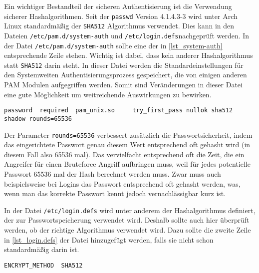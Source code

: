 Ein wichtiger Bestandteil der sicheren Authentisierung ist die Verwendung sicherer Hashalgorithmen. Seit der \texttt{passwd} Version 4.1.4.3-3 wird unter Arch Linux standardmäßig der \texttt{SHA512} Algorithmus verwendet.\cite{UseSha512Hash2009,SHAPasswordHashes} Dies kann in den Dateien \texttt{/etc/pam.d/system-auth} und \texttt{/etc/login.defs}nachgeprüft werden.\cite[S. 46]{GuideSecureConfiguration2011} In der Datei \texttt{/etc/pam.d/system-auth} sollte eine der in \ref{lst_system-auth} entsprechende Zeile stehen. Wichtig ist dabei, dass kein anderer Hashalgorithmus statt \texttt{SHA512} darin steht.\cite[S. 46]{GuideSecureConfiguration2011} In dieser Datei werden die Standardeinstellungen für den Systemweiten Authentisierungsprozess gespeichert, die von einigen anderen \ac{PAM} Modulen aufgegriffen werden. Somit sind Veränderungen in dieser Datei eine gute Möglichkeit um weitreichende Auswirkungen zu bewirken.\cite[S. 43]{GuideSecureConfiguration2011}

\begin{lstlisting}[caption=\texttt{/etc/pam.d/system-auth} Konfiguration, label=lst_system-auth]
	password  required  pam_unix.so     try_first_pass nullok sha512 shadow rounds=65536
\end{lstlisting}

Der Parameter \texttt{rounds=65536} verbessert zusätzlich die Passwortsicherheit, indem das eingerichtete Passwort genau diesem Wert entsprechend oft gehasht wird {\small(in diesem Fall also 65536 mal)}. Das vervielfacht entsprechend oft die Zeit, die ein Angreifer für einen Bruteforce Angriff aufbringen muss, weil für jedes potentielle Passwort 65536 mal der Hash berechnet werden muss. Zwar muss auch beispielsweise bei Logins das Passwort entsprechend oft gehasht werden, was, wenn man das korrekte Passwort kennt jedoch vernachlässigbar kurz ist.\cite{SHAPasswordHashes}

In der Datei \texttt{/etc/login.defs} wird unter anderem der Hashalgorithmus definiert, der zur Passwortspeicherung verwendet wird. Deshalb sollte auch hier überprüft werden, ob der richtige Algorithmus verwendet wird. Dazu sollte die zweite Zeile in \autoref{lst_login.defs} der Datei hinzugefügt werden, falls sie nicht schon standardmäßig darin ist.\cite[S. 46 f.]{GuideSecureConfiguration2011}

\begin{lstlisting}[caption=\texttt{/etc/login.defs} Hashalgorithmus, label=lst_login.defs]
	ENCRYPT_METHOD  SHA512
\end{lstlisting}

